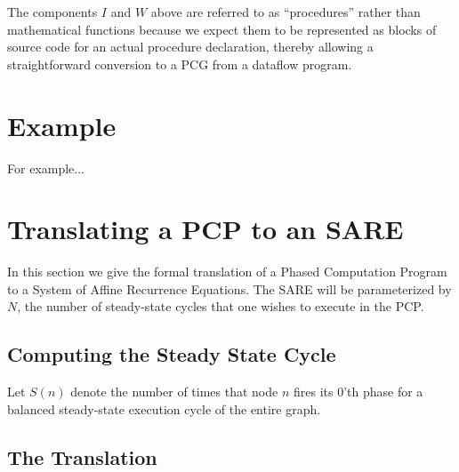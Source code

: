 The components $I$ and $W$ above are referred to as ``procedures''
rather than mathematical functions because we expect them to be
represented as blocks of source code for an actual procedure
declaration, thereby allowing a straightforward conversion to a PCG
from a dataflow program.

\section{Example}

For example...

\section{Translating a PCP to an SARE}

In this section we give the formal translation of a Phased Computation
Program to a System of Affine Recurrence Equations.  The SARE will be
parameterized by $N$, the number of steady-state cycles that one
wishes to execute in the PCP.

\subsection{Computing the Steady State Cycle}

Let $S(n)$ denote the number of times that node $n$ fires its 0'th
phase for a balanced steady-state execution cycle of the entire graph.

\subsection{The Translation}

